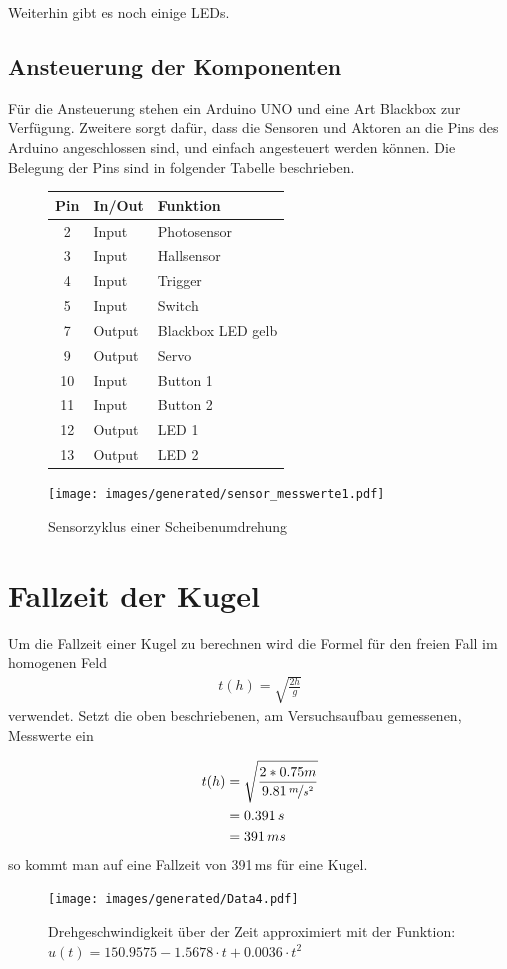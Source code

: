 Weiterhin gibt es noch einige LEDs.

\subsection{Ansteuerung der Komponenten}
Für die Ansteuerung stehen ein Arduino UNO und eine Art Blackbox zur Verfügung.
Zweitere sorgt dafür, dass die Sensoren und Aktoren an die Pins des Arduino angeschlossen sind, und einfach angesteuert werden können.
Die Belegung der Pins sind in folgender Tabelle beschrieben.


\begin{figure}[h] \centering
\begin{tabular}{cll} 
	\textbf{Pin} 	& \textbf{In/Out} & \textbf{Funktion}	\\
	\toprule
	2 &	Input &	Photosensor \\
	3 &	Input &	Hallsensor\\
	4 &	Input &	Trigger\\
	5 &	Input &	Switch\\
	7 &	Output &	Blackbox LED gelb\\
	9 &	Output &	Servo\\
	10 &	Input &	Button 1\\
	11 &	Input &	Button 2\\
	12 &	Output &	LED 1\\
	13 &	Output &	LED 2\\
	\bottomrule
\end{tabular}
\end{figure}

\begin{figure}[h] \centering
	\texttt{[image: images/generated/sensor\_messwerte1.pdf]}
	\caption{Sensorzyklus einer Scheibenumdrehung}
	\label{img:sensorwerte}
\end{figure}

\section{Fallzeit der Kugel}
Um die Fallzeit einer Kugel zu berechnen wird die Formel für den freien Fall im homogenen Feld
\begin{align}
	t(h) = \sqrt{\frac{2h}{g}}
\end{align}
verwendet.
Setzt die oben beschriebenen, am Versuchsaufbau gemessenen, Messwerte ein

\begin{align}
t(h) &= \sqrt{\frac{2 * 0.75m}{9.81\,\nicefrac{m}{s^2}}} \\
	 &= 0.391\,s \\
	 &= 391\,ms
\end{align}
so kommt man auf eine Fallzeit von 391\,ms für eine Kugel.



\begin{figure}[hb] \centering
	\texttt{[image: images/generated/Data4.pdf]}
	\caption{Drehgeschwindigkeit über der Zeit approximiert mit der Funktion: \newline $u(t) = 150.9575 - 1.5678\cdot t + 0.0036 \cdot t^2$}
\end{figure}

